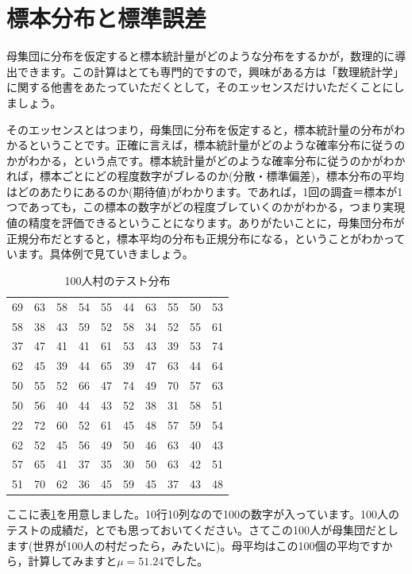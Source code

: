 \documentclass{ltjsbook}
\begin{document}
\section{標本分布と標準誤差}
母集団に分布を仮定すると標本統計量がどのような分布をするかが，数理的に導出できます。この計算はとても専門的ですので，興味がある方は「数理統計学」に関する他書をあたっていただくとして，そのエッセンスだけいただくことにしましょう。

そのエッセンスとはつまり，母集団に分布を仮定すると，標本統計量の分布がわかるということです。正確に言えば，標本統計量がどのような確率分布に従うのかがわかる，という点です。標本統計量がどのような確率分布に従うのかがわかれば，標本ごとにどの程度数字がブレるのか(分散・標準偏差)，標本分布の平均はどのあたりにあるのか(期待値)がわかります。であれば，1回の調査＝標本が1つであっても，この標本の数字がどの程度ブレていくのかがわかる，つまり実現値の精度を評価できるということになります。ありがたいことに，母集団分布が正規分布だとすると，標本平均の分布も正規分布になる，ということがわかっています。具体例で見ていきましょう。

\begin{table}[ht]
    \centering
    \caption{100人村のテスト分布}
    \begin{tabular}{rrrrrrrrrr}
      \hline
    69 & 63 & 58 & 54 & 55 & 44 & 63 & 55 & 50 & 53 \\ 
      58 & 38 & 43 & 59 & 52 & 58 & 34 & 52 & 55 & 61 \\ 
      37 & 47 & 41 & 41 & 61 & 53 & 43 & 39 & 53 & 74 \\ 
      62 & 45 & 39 & 44 & 65 & 39 & 47 & 63 & 44 & 64 \\ 
      50 & 55 & 52 & 66 & 47 & 74 & 49 & 70 & 57 & 63 \\ 
      50 & 56 & 40 & 44 & 43 & 52 & 38 & 31 & 58 & 51 \\ 
      22 & 72 & 60 & 52 & 61 & 45 & 48 & 57 & 59 & 54 \\ 
      62 & 52 & 45 & 56 & 49 & 50 & 46 & 63 & 40 & 43 \\ 
      57 & 65 & 41 & 37 & 35 & 30 & 50 & 63 & 42 & 51 \\ 
      51 & 70 & 62 & 36 & 45 & 59 & 45 & 37 & 43 & 48 \\ 
       \hline
    \end{tabular}
    \label{tbl::16_01}
    \end{table}

ここに表\ref{tbl::16_01}を用意しました。10行10列なので100の数字が入っています。100人のテストの成績だ，とでも思っておいてください。さてこの100人が母集団だとします(世界が100人の村だったら，みたいに)。母平均はこの100個の平均ですから，計算してみますと$\mu=51.24$でした。
\end{document}
